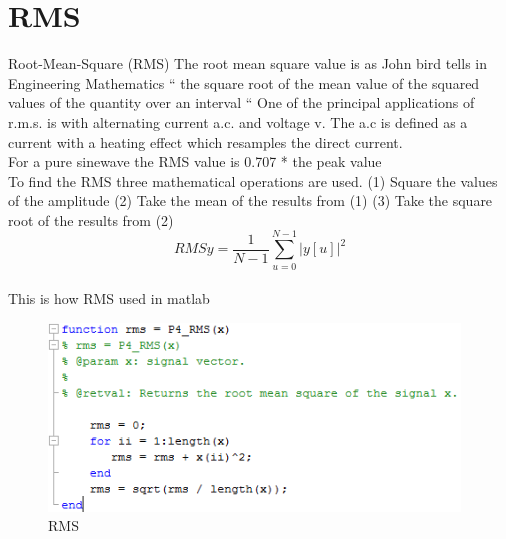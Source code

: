 \section{RMS}
Root-Mean-Square (RMS)
The root mean square value is as John bird tells in Engineering Mathematics \cite{Bird2007
} “ the square root of the mean value of the squared values of the quantity over an interval “
One of the principal applications of r.m.s. is with alternating current a.c. and voltage v. The a.c is defined as a current with a heating effect which resamples the direct current. \cite{Bird2007}
\\
For a pure sinewave the RMS value is 0.707 * the peak value
\\
To find the RMS three mathematical operations are used.
(1)	Square the values of the amplitude
(2)	Take the mean of the results from (1)
(3)	Take the square root of the results from (2)
\begin{equation}\label{eq:RMS formular}
RMSy = \frac{1}{N-1}\sum_{u=0}^{N-1}|y[u]|^2
\end{equation}
\\
This is how RMS used in matlab\\
\begin{figure}
\begin{center}
\includegraphics[height=5cm]{fig/RMS_matlabCode.png}
\caption{RMS}
\end{center}
\end{figure}
